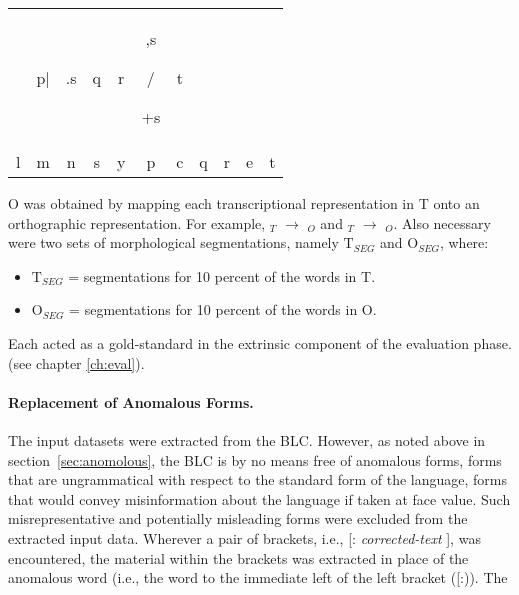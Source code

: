\begin{table}[ht]
\begin{tabular}{c c c c c c c c c c c}
           & \begin{cjhebrew}p|\end{cjhebrew} & \begin{cjhebrew}.s\end{cjhebrew} & \begin{cjhebrew}q\end{cjhebrew} & \begin{cjhebrew}r\end{cjhebrew} & \begin{cjhebrew},s\end{cjhebrew}/\begin{cjhebrew}+s\end{cjhebrew} & \begin{cjhebrew}t\end{cjhebrew} \\
	  l & m & n & s & y & p & c & q & r & e & t \\
\hline
\end{tabular}
\end{table}
O was obtained by mapping each transcriptional representation 
in T onto an orthographic representation. For example, $_T$ $\to$
$_O$ and $_T$ $\to$ $_O$.
Also necessary were two sets of morphological segmentations, namely $\text{T}_{SEG}$ and $\text{O}_{SEG}$, where:
\begin{itemize}
\item $\text{T}_{SEG}$ = segmentations for 10 percent of the words in T.
\item  $\text{O}_{SEG}$ = segmentations for 10 percent of the words in O.
\end{itemize} 
Each acted as a gold-standard in the extrinsic 
component of the evaluation phase. (see chapter \ref{ch:eval}).  

\paragraph{Replacement of Anomalous Forms.} 
The input datasets were extracted from the \ac{BLC}. However, as noted above in 
section~\ref{sec:anomolous}, the \ac{BLC} is by no means free of anomalous forms, 
forms that are ungrammatical with respect to the standard form of the language, 
forms that would convey misinformation about the language if taken at face value. 
Such misrepresentative and potentially misleading forms were excluded from the 
extracted input data.  
Wherever a pair of brackets, i.e., \textsf{[: \textit{corrected-text} ]}, was encountered, 
the material within the brackets was extracted in place of the anomalous word (i.e., the 
word to the immediate left of the left bracket (\textsf{[:})). The 

